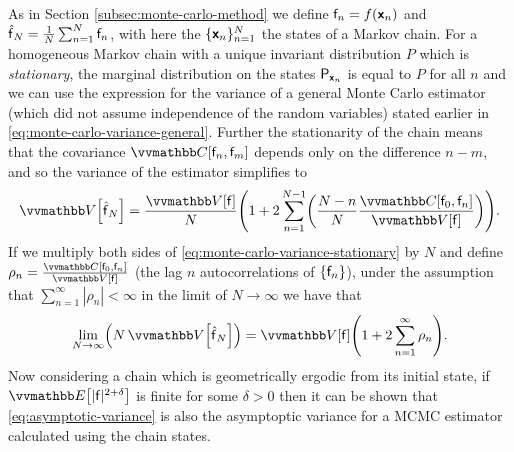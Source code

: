 As in Section \ref{subsec:monte-carlo-method} we define $\mathsf{f}_n = f(\boldsymbol{\mathsf{x}}_n)$ and $\hatf_N = \frac{1}{N} \sum_{n=1}^N \rvar{f}_n$, with here the $\lbrace \boldsymbol{\mathsf{x}}_n \rbrace_{n=1}^N$ the states of a Markov chain. For a homogeneous Markov chain with a unique invariant distribution $P$ which is \emph{stationary}, the marginal distribution on the states $\mathsf{P}_{\boldsymbol{\mathsf{x}}_n}$ is equal to $P$ for all $n$ and we can use the expression for the variance of a general Monte Carlo estimator (which did not assume independence of the random variables) stated earlier in \eqref{eq:monte-carlo-variance-general}. Further the stationarity of the chain means that the covariance $\cov{\rvar{f}_n, \rvar{f}_m}$ depends only on the difference $n - m$, and so the variance of the estimator simplifies to
\begin{equation}\label{eq:monte-carlo-variance-stationary}
  \var{\hatf_N}
  =
  \frac{\var{\rvar{f}}}{N}
  \lpa 
    1 + 2\sum_{n=1}^{N-1} \lpa \frac{N-n}{N} \frac{\cov{\rvar{f}_0, \rvar{f}_n}}{\var{\rvar{f}}}\rpa
  \rpa.
\end{equation}
If we multiply both sides of \eqref{eq:monte-carlo-variance-stationary} by $N$ and define $\rho_{n} = \frac{\cov{\rvar{f}_0, \rvar{f}_n}}{\var{\rvar{f}}}$ (the lag $n$ autocorrelations of $\lbrace \mathsf{f}_n \rbrace$), under the assumption that $\sum_{n=1}^\infty |\rho_n| < \infty$ in the limit of $N \to \infty$ we have that
\begin{equation}\label{eq:asymptotic-variance}
  \lim_{N\to\infty} \lpa N \, \var{\hatf_N} \rpa = \var{\rvar{f}} \lpa 1 + 2\sum_{n=1}^\infty \rho_n\rpa.
\end{equation}
Now considering a chain which is geometrically ergodic from its initial state, if $\expc{|\rvar{f}|^{2+\delta}}$ is finite for some $\delta > 0$ then it can be shown \citep{chan1994discussion,geyer1998markov,roberts2004general} that \eqref{eq:asymptotic-variance} is also the asymptoptic variance for a \ac{MCMC} estimator calculated using the chain states.

